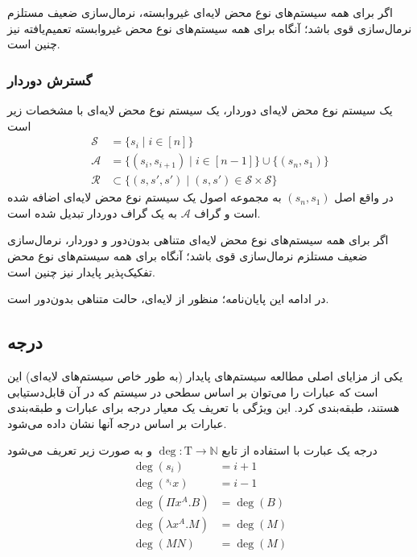 \begin{cor}
اگر برای همه سیستم‌های نوع محض لایه‌ای غیروابسته، نرمال‌سازی ضعیف مستلزم نرمال‌سازی قوی باشد؛ آنگاه برای همه سیستم‌های نوع محض غیروابسته تعمیم‌یافته نیز چنین است.
\end{cor}

\subsubsection{گسترش دوردار}

\begin{defn}
یک سیستم نوع محض لایه‌ای دوردار، یک سیستم نوع محض لایه‌ای با مشخصات زیر است
\begin{align*}
\mathcal{S} &= \{ s_i \mid i \in [n] \}\\
\mathcal{A} &= \{ (s_i,s_{i+1}) \mid i \in [n-1] \} \cup \{(s_n,s_1)\} \\
\mathcal{R} &\subset \{ (s,s',s') \mid (s,s') \in \mathcal{S} \times \mathcal{S} \}
\end{align*}
در واقع اصل
$(s_n,s_1)$
به مجموعه اصول یک سیستم نوع محض لایه‌ای اضافه شده است و گراف
$\mathcal{A}$
به یک گراف دور‌دار تبدیل شده است.
\end{defn}

\begin{prop}
اگر برای همه سیستم‌های نوع محض لایه‌ای متناهی بدون‌دور و دوردار، نرمال‌سازی ضعیف مستلزم نرمال‌سازی قوی باشد؛ آنگاه برای همه سیستم‌های نوع محض تفکیک‌پذیر پایدار نیز چنین است.
\end{prop}

\begin{rem}
در ادامه این پایان‌نامه؛ منظور از لایه‌ای، حالت متناهی بدون‌دور است.
\end{rem}

\subsection*{درجه}

یکی از مزایای اصلی مطالعه سیستم‌های پایدار  (به طور خاص سیستم‌های لایه‌ای) این است که عبارات را می‌توان بر اساس سطحی در سیستم که در آن قابل‌دستیابی هستند، طبقه‌بندی کرد. این ویژگی با تعریف یک معیار درجه برای عبارات و طبقه‌بندی عبارات بر اساس درجه آنها نشان داده می‌شود.

\begin{defn}
درجه یک عبارت با استفاده از تابع
$\operatorname{deg}: \mathrm{T} \to \mathbb{N}$ و به صورت زیر تعریف می‌شود
\begin{align*}
\operatorname{deg}(s_i) &= i + 1\\
\operatorname{deg}(^{s_i}x) &= i - 1\\
\operatorname{deg}(\Pi x^A.B) &= \operatorname{deg}(B)\\
\operatorname{deg}(\lambda x^A.M) &= \operatorname{deg}(M)\\
\operatorname{deg}(MN) &= \operatorname{deg}(M)
\end{align*}
\end{defn}

